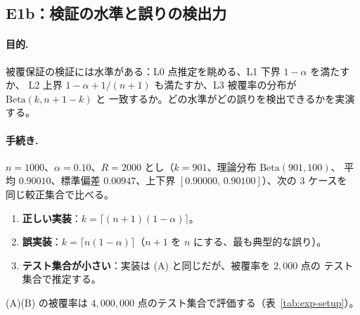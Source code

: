 \documentclass[a4paper,11pt]{jsarticle}
\theoremstyle{definition}
\theoremstyle{plain}
\theoremstyle{remark}
\begin{document}

\subsection{E1b：検証の水準と誤りの検出力}
\label{sec:e1b}

\paragraph{目的.}
被覆保証の検証には水準がある：L0 点推定を眺める、L1 下界 $1-\alpha$ を満たすか、
L2 上界 $1-\alpha+1/(n+1)$ も満たすか、L3 被覆率の分布が $\mathrm{Beta}(k,n+1-k)$ と
一致するか。どの水準がどの誤りを検出できるかを実演する。

\paragraph{手続き.}
$n=1000$、$\alpha=0.10$、$R=2000$ とし（$k=901$、理論分布 $\mathrm{Beta}(901,100)$、
平均 $0.90010$、標準偏差 $0.00947$、上下界 $[0.90000,\,0.90100]$）、次の $3$ ケースを
同じ較正集合で比べる。
\begin{enumerate}
  \item[(A)] \textbf{正しい実装}：$k=\lceil(n+1)(1-\alpha)\rceil$。
  \item[(B)] \textbf{誤実装}：$k=\lceil n(1-\alpha)\rceil$（$n+1$ を $n$ にする、最も典型的な誤り）。
  \item[(C)] \textbf{テスト集合が小さい}：実装は (A) と同じだが、被覆率を $2{,}000$ 点の
    テスト集合で推定する。
\end{enumerate}
(A)(B) の被覆率は $4{,}000{,}000$ 点のテスト集合で評価する（表~\ref{tab:exp-setup}）。
\end{document}
